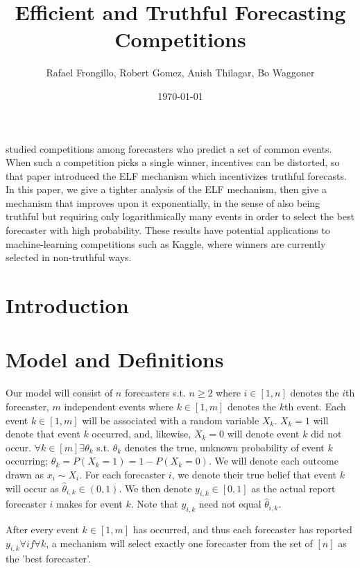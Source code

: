 \documentclass[letterpaper,12pt]{article}
\renewenvironment{abstract}
 {
  \begin{center}
  \vspace{3em} \bfseries \abstractname\vspace{0em}\vspace{0pt}
  \end{center}
  \list{}{%
    \setlength{\leftmargin}{20mm}%
    \setlength{\rightmargin}{\leftmargin}%
  }%
  \item\relax}
 {\endlist}
\newcommand{\1}{\mathbbm{1}}
\begin{document}
\title{Efficient and Truthful Forecasting Competitions}
\author{Rafael Frongillo, Robert Gomez, Anish Thilagar, Bo Waggoner}
\date{\today}
\maketitle


\begin{abstract}
   \citet{witkowski2018incentive} studied competitions among forecasters who predict a set of common events.
   When such a competition picks a single winner, incentives can be distorted, so that paper introduced the ELF mechanism which incentivizes truthful forecasts.
   In this paper, we give a tighter analysis of the ELF mechanism, then give a mechanism that improves upon it exponentially, in the sense of also being truthful but requiring only logarithmically many events in order to select the best forecaster with high probability.
   These results have potential applications to machine-learning competitions such as Kaggle, where winners are currently selected in non-truthful ways. 
\end{abstract}


\section{Introduction}

\section{Model and Definitions}
Our model will consist of $n$ forecasters s.t. $n \ge 2$ where $i \in [1,n]$ denotes the $i$th forecaster, $m$ independent events where $k \in [1,m]$ denotes the $k$th event. Each event $k \in [1,m]$ will be associated with a random variable $X_k$. $X_k = 1$ will denote that event $k$ occurred, and, likewise, $X_k = 0$ will denote event $k$ did not occur. $\forall k \in [m] \exists \theta_k$ s.t. $\theta_k$ denotes the true, unknown probability of event $k$ occurring;  $\theta_k = P(X_k = 1) = 1 - P(X_k = 0)$. We will denote each outcome drawn as $x_i \sim X_i$. For each forecaster $i$, we denote their true belief that event $k$ will occur as $\hat{\theta}_{i,k} \in (0,1)$. We then denote $y_{i,k} \in [0,1]$ as the actual report forecaster $i$ makes for event $k$. Note that $y_{i,k}$ need not equal $\hat{\theta}_{i,k}$. 

After every event $k \in [1,m]$ has occurred, and thus each forecaster has reported $y_{i,k} \forall i f\forall k$, a mechanism will select exactly one forecaster from the set of $[n]$ as the 'best forecaster'.
\end{document}
